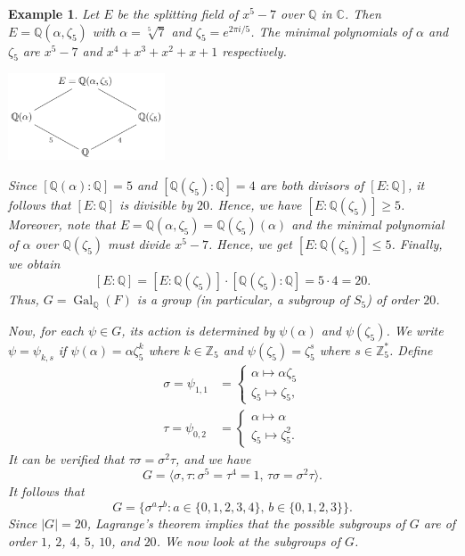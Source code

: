 \documentclass[10pt]{article}
\newcommand{\C}{\mathbb{C}}
\newcommand{\Z}{\mathbb{Z}}
\newcommand{\Q}{\mathbb{Q}}
\DeclareMathOperator{\Gal}{Gal}
\theoremstyle{newstyle}
\newtheorem{exmp}[thm]{Example}
\begin{document}
\begin{exmp}
Let $E$ be the splitting field of $x^5 - 7$ over $\Q$ in $\C$. Then $E = \Q(\alpha, \zeta_5)$ 
with $\alpha = \sqrt[5]{7}$ and $\zeta_5 = e^{2\pi i/5}$. The minimal polynomials of $\alpha$ and 
$\zeta_5$ are $x^5 - 7$ and $x^4 + x^3 + x^2 + x + 1$ respectively. 

\begin{center} \includegraphics[width=0.35\textwidth]{9-14-1.png} \end{center}

Since $[\Q(\alpha) : \Q] = 5$ and $[\Q(\zeta_5) : \Q] = 4$ are both divisors of 
$[E : \Q]$, it follows that $[E : \Q]$ is divisible by $20$. Hence, we have 
$[E : \Q(\zeta_5)] \geq 5$. Moreover, note that $E = \Q(\alpha, \zeta_5) = 
\Q(\zeta_5)(\alpha)$ and the minimal polynomial of $\alpha$ over $\Q(\zeta_5)$ must 
divide $x^5 - 7$. Hence, we get $[E : \Q(\zeta_5)] \leq 5$. Finally, we obtain 
\[ [E : \Q] = [E : \Q(\zeta_5)] \cdot [\Q(\zeta_5) : \Q] = 5 \cdot 4 = 20. \]
Thus, $G = \Gal_\Q(F)$ is a group (in particular, a subgroup of $S_5$) of order $20$. 

Now, for each $\psi \in G$, its action is determined by $\psi(\alpha)$ and $\psi(\zeta_5)$. 
We write $\psi = \psi_{k,s}$ if $\psi(\alpha) = \alpha\zeta_5^k$ where $k \in \Z_5$ and 
$\psi(\zeta_5) = \zeta_5^s$ where $s \in \Z_5^*$. Define 
\begin{align*}
    \sigma = \psi_{1,1} &= \begin{cases} \alpha \mapsto \alpha\zeta_5 \\ \zeta_5 \mapsto \zeta_5, 
    \end{cases} \\
    \tau = \psi_{0,2} &= \begin{cases} \alpha \mapsto \alpha \\ \zeta_5 \mapsto \zeta_5^2. \end{cases}
\end{align*}
It can be verified that $\tau\sigma = \sigma^2\tau$, and we have 
\[ G = \langle \sigma, \tau : \sigma^5 = \tau^4 = 1,\, \tau\sigma = \sigma^2\tau \rangle. \]
It follows that 
\[ G = \{\sigma^a \tau^b : a \in \{0, 1, 2, 3, 4\},\, b \in \{0, 1, 2, 3\}\}. \]
Since $|G| = 20$, Lagrange's theorem implies that the possible subgroups of $G$ 
are of order $1$, $2$, $4$, $5$, $10$, and $20$. We now look at the subgroups of $G$. 


\end{exmp}
\end{document}
